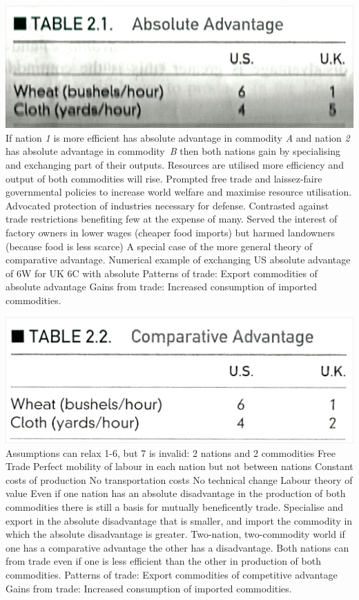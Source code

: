 \documentclass[12pt]{examnotes}
\begin{document}
\includegraphics[scale=0.2]{./imgs/t21.jpg}
\ra If nation \emph{1} is more efficient has absolute advantage in commodity \emph{A} and nation \emph{2} has absolute advantage in \mbox{commodity \emph{B}} then both nations gain by specialising and exchanging part of their outputs.
\ra Resources are utilised more efficiency and output of both commodities will rise.
\ra Prompted free trade and laissez-faire governmental policies to increase world welfare and maximise resource utilisation.
\ra Advocated protection of industries necessary for defense.
\ra Contrasted against trade restrictions benefiting few at the expense of many.
\ra Served the interest of factory owners in lower wages (cheaper food imports) but harmed landowners (because food is less scarce) 
\ra A special case of the more general theory of comparative advantage.
\ra Numerical example of exchanging US absolute advantage of 6W for UK 6C with absolute 
\ra Patterns of trade: Export commodities of absolute advantage
\ra Gains from trade: Increased consumption of imported commodities.

\includegraphics[scale=0.2]{./imgs/t22.jpg}
\ra Assumptions can relax 1-6, but 7 is invalid:
 2 nations and 2 commodities
 Free Trade
 Perfect mobility of labour in each nation but not between nations
 Constant costs of production 
 No transportation costs
 No technical change
 Labour theory of value
\ra Even if one nation has an absolute disadvantage in the production of both commodities there is still a basis for mutually beneficently trade.
\ra Specialise and export in the absolute disadvantage that is smaller, and import the commodity in which the absolute disadvantage is greater.
\ra Two-nation, two-commodity world if one has a comparative advantage the other has a disadvantage.
\ra Both nations can from trade even if one is less efficient than the other in production of both commodities.
\ra Patterns of trade: Export commodities of competitive advantage
\ra Gains from trade: Increased consumption of imported commodities.
\end{document}
